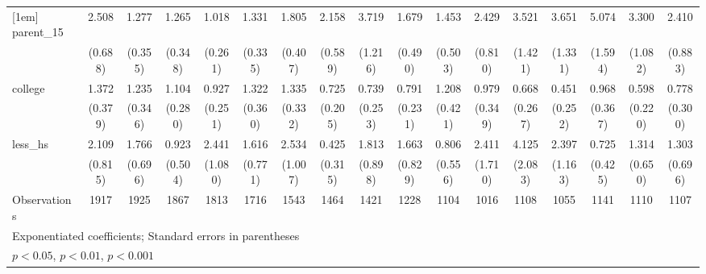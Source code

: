{\begin{tabular}{l*{16}{c}}
[1em]
parent\_15           &       2.508\sym{***}&       1.277         &       1.265         &       1.018         &       1.331         &       1.805\sym{**} &       2.158\sym{**} &       3.719\sym{***}&       1.679         &       1.453         &       2.429\sym{**} &       3.521\sym{**} &       3.651\sym{***}&       5.074\sym{***}&       3.300\sym{***}&       2.410\sym{*}  \\
                    &     (0.688)         &     (0.355)         &     (0.348)         &     (0.261)         &     (0.335)         &     (0.407)         &     (0.589)         &     (1.216)         &     (0.490)         &     (0.503)         &     (0.810)         &     (1.421)         &     (1.331)         &     (1.594)         &     (1.082)         &     (0.883)         \\
[1em]
college             &       1.372         &       1.235         &       1.104         &       0.927         &       1.322         &       1.335         &       0.725         &       0.739         &       0.791         &       1.208         &       0.979         &       0.668         &       0.451         &       0.968         &       0.598         &       0.778         \\
                    &     (0.379)         &     (0.346)         &     (0.280)         &     (0.251)         &     (0.360)         &     (0.332)         &     (0.205)         &     (0.253)         &     (0.231)         &     (0.421)         &     (0.349)         &     (0.267)         &     (0.252)         &     (0.367)         &     (0.220)         &     (0.300)         \\
[1em]
less\_hs             &       2.109         &       1.766         &       0.923         &       2.441\sym{*}  &       1.616         &       2.534\sym{*}  &       0.425         &       1.813         &       1.663         &       0.806         &       2.411         &       4.125\sym{**} &       2.397         &       0.725         &       1.314         &       1.303         \\
                    &     (0.815)         &     (0.696)         &     (0.504)         &     (1.080)         &     (0.771)         &     (1.007)         &     (0.315)         &     (0.898)         &     (0.829)         &     (0.556)         &     (1.710)         &     (2.083)         &     (1.163)         &     (0.425)         &     (0.650)         &     (0.696)         \\
\hline
Observations        &        1917         &        1925         &        1867         &        1813         &        1716         &        1543         &        1464         &        1421         &        1228         &        1104         &        1016         &        1108         &        1055         &        1141         &        1110         &        1107         \\
\hline\hline
\multicolumn{17}{l}{\footnotesize Exponentiated coefficients; Standard errors in parentheses}\\
\multicolumn{17}{l}{\footnotesize \sym{*} \(p<0.05\), \sym{**} \(p<0.01\), \sym{***} \(p<0.001\)}\\
\end{tabular}
}
